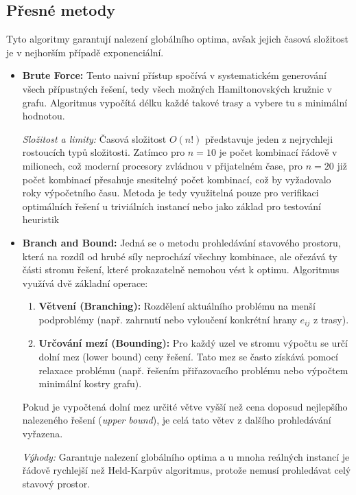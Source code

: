 \subsection{Přesné metody}
Tyto algoritmy garantují nalezení globálního optima, avšak jejich časová složitost je v nejhorším případě exponenciální.
\begin{itemize}
\item \textbf{Brute Force:} 
    Tento naivní přístup spočívá v systematickém generování všech přípustných řešení, tedy všech možných Hamiltonovských kružnic v grafu. Algoritmus vypočítá délku každé takové trasy a vybere tu s minimální hodnotou.
    
    \textit{Složitost a limity:} Časová složitost $O(n!)$ představuje jeden z nejrychleji rostoucích typů složitosti. Zatímco pro $n=10$ je počet kombinací řádově v milionech, což moderní procesory zvládnou v přijatelném čase, pro $n=20$ již počet kombinací přesahuje snesitelný počet kombinací, což by vyžadovalo roky výpočetního času. Metoda je tedy využitelná pouze pro verifikaci optimálních řešení u triviálních instancí nebo jako základ pro testování heuristik %

    \item \textbf{Branch and Bound:} 
    Jedná se o metodu prohledávání stavového prostoru, která na rozdíl od hrubé síly neprochází všechny kombinace, ale ořezává ty části stromu řešení, které prokazatelně nemohou vést k optimu. Algoritmus využívá dvě základní operace:
    \begin{enumerate}
        \item \textbf{Větvení (Branching):} Rozdělení aktuálního problému na menší podproblémy (např. zahrnutí nebo vyloučení konkrétní hrany $e_{ij}$ z trasy).
        \item \textbf{Určování mezí (Bounding):} Pro každý uzel ve stromu výpočtu se určí dolní mez (lower bound) ceny řešení. Tato mez se často získává pomocí relaxace problému (např. řešením přiřazovacího problému nebo výpočtem minimální kostry grafu).
    \end{enumerate}
    
    Pokud je vypočtená dolní mez určité větve vyšší než cena doposud nejlepšího nalezeného řešení (\textit{upper bound}), je celá tato větev z dalšího prohledávání vyřazena. 
    
    \textit{Výhody:} Garantuje nalezení globálního optima a u mnoha reálných instancí je řádově rychlejší než Held-Karpův algoritmus, protože nemusí prohledávat celý stavový prostor.
    

\end{itemize}

